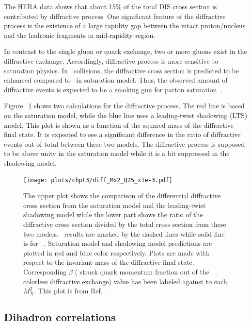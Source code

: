 The HERA data shows that about 15\% of the total DIS cross section is
contributed by diffractive process. One significant feature of the diffractive
process is the existence of a large rapidity gap between the intact
proton/nucleus and the hadronic fragments in mid-rapidity region.

In contrast to the single gluon or quark exchange, two or more gluons exist in
the diffractive exchange. Accordingly, diffractive process is more sensitive to
saturation physics. In \eA\ collisions, the diffractive cross section is predicted to be
enhanced compared to \ep\ in saturation model. Thus, the observed amount of
diffractive events is expected to be a smoking gun for parton
saturation~\cite{Kowalski:2008sa}.

Figure.~\ref{fig:diff_eA} shows two calculations for the diffractive process.
The red line is based on the saturation model, while the blue line uses a
leading-twist shadowing (LTS) model. This plot is shown as a function of the squared mass
of the diffractive final state. It is expected to see a significant difference
in the ratio of diffractive events out of total between these two models. The
diffractive process is supposed to be above unity in the saturation model while it
is a bit suppressed in the shadowing model.
\begin{figure}
\centering
\texttt{[image: plots/chpt3/diff\_Mx2\_Q25\_x1e-3.pdf]}
\caption[Ratio of diffractive cross section out of the total cross section from saturation model and shadowing model]{
The upper plot shows the comparison of the differential diffractive cross section from the saturation model and the leading-twist shadowing model while the lower part shows the ratio of the diffractive cross section divided by the total cross section from these two models. 
\eAu\ results are marked by the dashed lines while solid line is for \ep\ . Saturation model and shadowing model predictions
are plotted in red and blue color respectively. Plots are made with respect to the invariant mass of the diffractive final state. Corresponding $\beta$ ( struck quark momentum fraction out of the colorless diffractive exchange) value has been labeled against to each $M_{X}^{2}$.
This plot is from Ref.~\cite{Aschenauer:2014a}.}
\label{fig:diff_eA}
\end{figure}

\subsection{Dihadron correlations}  \label{subsec:dihadron_preintro}

